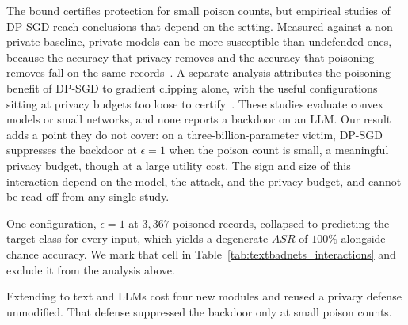 The bound certifies protection for small poison counts, but empirical studies of DP-SGD reach conclusions that depend on the setting.
Measured against a non-private baseline, private models can be more susceptible than undefended ones, because the accuracy that privacy removes and the accuracy that poisoning removes fall on the same records~\cite{jagielski2021DoesDifferentialPrivacy}.
A separate analysis attributes the poisoning benefit of DP-SGD to gradient clipping alone, with the useful configurations sitting at privacy budgets too loose to certify~\cite{hong2020EffectivenessMitigatingData}.
These studies evaluate convex models or small networks, and none reports a backdoor on an LLM.
Our result adds a point they do not cover: on a three-billion-parameter victim, DP-SGD suppresses the backdoor at $\epsilon=1$ when the poison count is small, a meaningful privacy budget, though at a large utility cost.
The sign and size of this interaction depend on the model, the attack, and the privacy budget, and cannot be read off from any single study.

One configuration, $\epsilon=1$ at $3{,}367$ poisoned records, collapsed to predicting the target class for every input, which yields a degenerate $ASR$ of $100\%$ alongside chance accuracy.
We mark that cell in Table~\ref{tab:textbadnets_interactions} and exclude it from the analysis above.

\begin{takeaway}
Extending \method to text and LLMs cost four new modules and reused a privacy defense unmodified.
That defense suppressed the backdoor only at small poison counts.
\end{takeaway}
